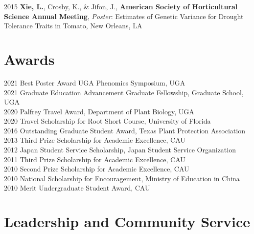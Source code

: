 \documentclass[11pt,a4paper,]{awesome-cv}
\begin{document}
2015 \textbf{Xie, L.}, Crosby, K., \& Jifon, J., \textbf{American
Society of Horticultural Science Annual Meeting}, \emph{Poster}:
Estimates of Genetic Variance for Drought Tolerance Traits in Tomato,
New Orleans, LA

\hypertarget{awards}{%
\section{Awards}\label{awards}}

2021 Best Poster Award UGA Phenomics Symposium, UGA\\
2021 Graduate Education Advancement Graduate Fellowship, Graduate
School, UGA\\
2020 Palfrey Travel Award, Department of Plant Biology, UGA\\
2020 Travel Scholarship for Root Short Course, University of Florida\\
2016 Outstanding Graduate Student Award, Texas Plant Protection
Association\\
2013 Third Prize Scholarship for Academic Excellence, CAU\\
2012 Japan Student Service Scholarship, Japan Student Service
Organization\\
2011 Third Prize Scholarship for Academic Excellence, CAU\\
2010 Second Prize Scholarship for Academic Excellence, CAU\\
2010 National Scholarship for Encouragement, Ministry of Education in
China\\
2010 Merit Undergraduate Student Award, CAU

\hypertarget{leadership-and-community-service}{%
\section{Leadership and Community
Service}\label{leadership-and-community-service}}
\end{document}
